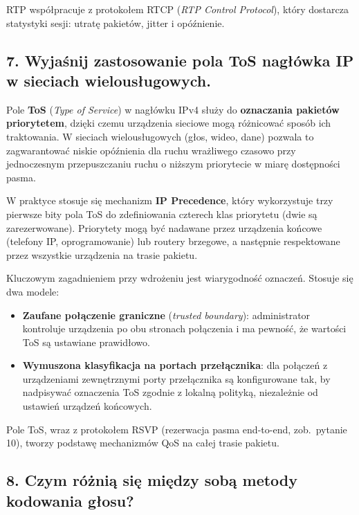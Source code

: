 \documentclass[12pt,a4paper]{article}
\begin{document}
RTP współpracuje z protokołem RTCP (\emph{RTP Control Protocol}), który
dostarcza statystyki sesji: utratę pakietów, jitter i opóźnienie.

\subsection*{7. Wyjaśnij zastosowanie pola ToS nagłówka IP w sieciach
wielousługowych.}

Pole \textbf{ToS} (\emph{Type of Service}) w nagłówku IPv4 służy do
\textbf{oznaczania pakietów priorytetem}, dzięki czemu urządzenia sieciowe
mogą różnicować sposób ich traktowania. W sieciach wielousługowych (głos,
wideo, dane) pozwala to zagwarantować niskie opóźnienia dla ruchu
wrażliwego czasowo przy jednoczesnym przepuszczaniu ruchu o niższym priorytecie
w miarę dostępności pasma.

W praktyce stosuje się mechanizm \textbf{IP Precedence}, który wykorzystuje
trzy pierwsze bity pola ToS do zdefiniowania czterech klas priorytetu
(dwie są zarezerwowane). Priorytety mogą być nadawane przez urządzenia końcowe
(telefony IP, oprogramowanie) lub routery brzegowe, a następnie respektowane
przez wszystkie urządzenia na trasie pakietu.

Kluczowym zagadnieniem przy wdrożeniu jest wiarygodność oznaczeń. Stosuje
się dwa modele:
\begin{itemize}
  \item \textbf{Zaufane połączenie graniczne} (\emph{trusted boundary}):
        administrator kontroluje urządzenia po obu stronach połączenia
        i ma pewność, że wartości ToS są ustawiane prawidłowo.
  \item \textbf{Wymuszona klasyfikacja na portach przełącznika}: dla połączeń
        z urządzeniami zewnętrznymi porty przełącznika są konfigurowane tak,
        by nadpisywać oznaczenia ToS zgodnie z lokalną polityką, niezależnie
        od ustawień urządzeń końcowych.
\end{itemize}

Pole ToS, wraz z protokołem RSVP (rezerwacja pasma end-to-end, zob.\ pytanie 10),
tworzy podstawę mechanizmów QoS na całej trasie pakietu.

\subsection*{8. Czym różnią się między sobą metody kodowania głosu?}
\end{document}
